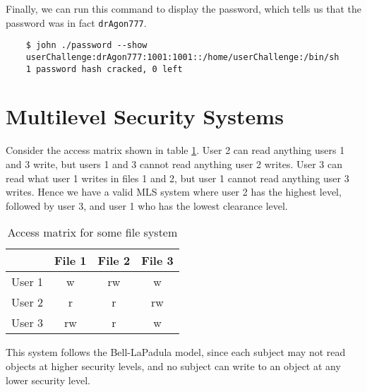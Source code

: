 \documentclass{article}
\begin{document}
Finally, we can run this command to display the password, which tells us that the password was in fact \verb`drAgon777`.

\begin{verbatim}
	$ john ./password --show
	userChallenge:drAgon777:1001:1001::/home/userChallenge:/bin/sh
	1 password hash cracked, 0 left
\end{verbatim}

\section{Multilevel Security Systems}

Consider the access matrix shown in table \ref{access-matrix}. User 2 can read anything users 1 and 3 write, but users 1 and 3 cannot read anything user 2 writes. User 3 can read what user 1 writes in files 1 and 2, but user 1 cannot read anything user 3 writes. Hence we have a valid MLS system where user 2 has the highest level, followed by user 3, and user 1 who has the lowest clearance level.

\begin{table}[hbp]
	\centering
	\begin{tabular}{|c||c|c|c|}
		\hline
		& File 1 & File 2 & File 3 \\
		\hline
		\hline
		User 1 & w & rw & w \\
		\hline
		User 2 & r & r & rw \\
		\hline
		User 3 & rw & r & w \\
		\hline
	\end{tabular}
	\caption{Access matrix for some file system}
	\label{access-matrix}
\end{table}

This system follows the Bell-LaPadula model, since each subject may not read objects at higher security levels, and no subject can write to an object at any lower security level.
\end{document}
